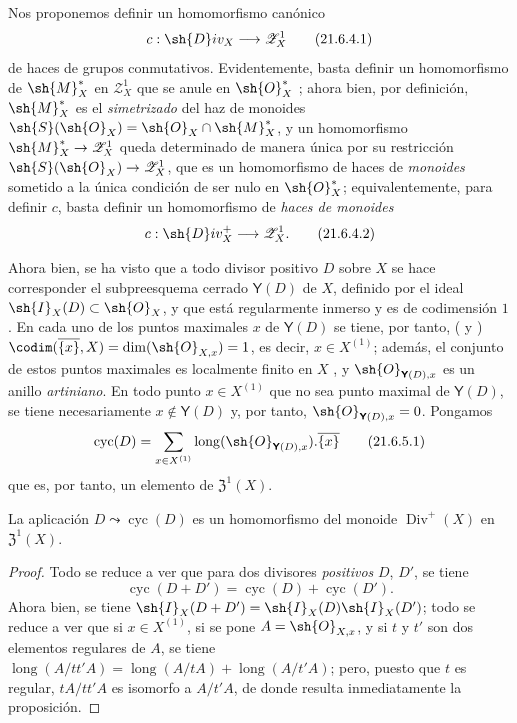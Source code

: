 \begin{env}[21.6.4]
\label{IV.21.6.4}
Nos proponemos definir un homomorfismo canónico
\[
\label{IV.21.6.4.1}
  c:\sh{D}iv_X\to\mathscr{Z}_X^1
  \tag{21.6.4.1}
\]
de haces de grupos conmutativos.
Evidentemente, basta definir un homomorfismo de $\sh{M}_X^*$ en $\mathscr{Z}_X^1$ que se anule en $\sh{O}_X^*$ ;
ahora bien, por definición, $\sh{M}_X^*$ es el \emph{simetrizado} del haz de monoides $\sh{S}(\sh{O}_X)=\sh{O}_X\cap\sh{M}_X^*$, y un homomorfismo $\sh{M}_X^*\to\mathscr{Z}_X^1$ queda determinado de manera única por su restricción $\sh{S}(\sh{O}_X)\to\mathscr{Z}_X^1$, que es un homomorfismo de haces de \emph{monoides} sometido a la única condición de ser nulo en $\sh{O}_X^*$;
equivalentemente, para definir $c$, basta definir un homomorfismo de \emph{haces de monoides}
\[
\label{IV.21.6.4.2}
  c:\sh{D}iv_X^+\to\mathscr{Z}_X^1.
  \tag{21.6.4.2}
\]
\end{env}

\begin{env}[21.6.5]
\label{IV.21.6.5}
Ahora bien, se ha visto que a todo divisor positivo $D$ sobre $X$ se hace corresponder el subpreesquema cerrado $\boldsymbol{\mathsf Y}(D)$ de $X$, definido por el ideal $\sh{I}_X(D)\subset\sh{O}_X$, y que está regularmente inmerso y es de codimensión $1$.
En cada uno de los puntos maximales $x$ de $\boldsymbol{\mathsf Y}(D)$ se tiene, por tanto, ( y ) $\codim(\overline{\{x\}},X)=\dim(\sh{O}_{X,x})=1$, es decir, $x\in X^{(1)}$;
además, el conjunto de estos puntos maximales es localmente finito en $X$ , y $\sh{O}_{\boldsymbol{\mathsf Y}(D),x}$ es un anillo \emph{artiniano}.
En todo punto $x\in X^{(1)}$ que no sea punto maximal de $\boldsymbol{\mathsf Y}(D)$, se tiene necesariamente $x\notin\boldsymbol{\mathsf Y}(D)$ y, por tanto, $\sh{O}_{\boldsymbol{\mathsf Y}(D),x}=0$.
Pongamos
\[
\label{IV.21.6.5.1}
  \operatorname{cyc}(D)=\sum_{x\in X^{(1)}}\operatorname{long}(\sh{O}_{\boldsymbol{\mathsf Y}(D),x}).\overline{\{x\}}
  \tag{21.6.5.1}
\]
que es, por tanto, un elemento de $\mathfrak{Z}^1(X)$.
\end{env}

\begin{proposition}[21.6.6]
\label{IV.21.6.6}
La aplicación $D\leadsto\operatorname{cyc}(D)$ es un homomorfismo del monoide $\operatorname{Div}^+(X)$ en $\mathfrak{Z}^1(X)$.
\end{proposition}

\begin{proof}
Todo se reduce a ver que para dos divisores \emph{positivos} $D$, $D'$, se tiene
\[
  \operatorname{cyc}(D+D')=\operatorname{cyc}(D)+\operatorname{cyc}(D').
\]
Ahora bien, se tiene  $\sh{I}_X(D+D')=\sh{I}_X(D)\sh{I}_X(D')$;
todo se reduce a ver que si $x\in X^{(1)}$, si se pone $A=\sh{O}_{X,x}$, y si $t$ y $t'$ son dos elementos regulares de $A$, se tiene $\operatorname{long}(A/tt'A)=\operatorname{long}(A/tA)+\operatorname{long}(A/t'A)$;
pero, puesto que $t$ es regular, $tA/tt'A$ es isomorfo a $A/t'A$, de donde resulta inmediatamente la proposición.
\end{proof}

